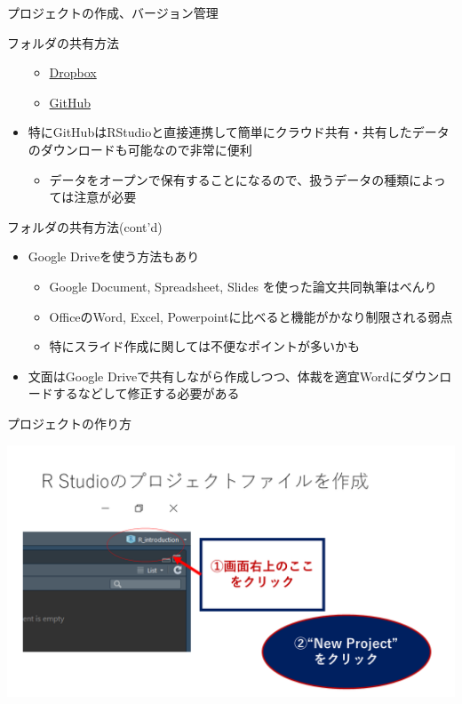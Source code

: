 \documentclass[
  ignorenonframetext,
]{beamer}
\providecommand{\tightlist}{%
  \setlength{\itemsep}{0pt}\setlength{\parskip}{0pt}}
\begin{document}
\begin{frame}{プロジェクトの作成、バージョン管理}
\begin{block}{フォルダの共有方法}
\begin{itemize}
  \begin{itemize}
  \tightlist
  \item
    \href{https://www.dropbox.com/}{Dropbox}
  \item
    \href{https://github.com/}{GitHub}
  \end{itemize}
\item
  特にGitHubはRStudioと直接連携して簡単にクラウド共有・共有したデータのダウンロードも可能なので非常に便利

  \begin{itemize}
  \tightlist
  \item
    データをオープンで保有することになるので、扱うデータの種類によっては注意が必要
  \end{itemize}
\end{itemize}
\end{block}

\begin{block}{フォルダの共有方法(cont'd)}
\protect\hypertarget{ux30d5ux30a9ux30ebux30c0ux306eux5171ux6709ux65b9ux6cd5contd}{}
\begin{itemize}
\tightlist
\item
  Google Driveを使う方法もあり

  \begin{itemize}
  \tightlist
  \item
    Google Document, Spreadsheet, Slides を使った論文共同執筆はべんり
  \item
    OfficeのWord, Excel, Powerpointに比べると機能がかなり制限される弱点
  \item
    特にスライド作成に関しては不便なポイントが多いかも
  \end{itemize}
\item
  文面はGoogle
  Driveで共有しながら作成しつつ、体裁を適宜Wordにダウンロードするなどして修正する必要がある
\end{itemize}
\end{block}

\begin{block}{プロジェクトの作り方}
\protect\hypertarget{ux30d7ux30edux30b8ux30a7ux30afux30c8ux306eux4f5cux308aux65b9}{}
\begin{center}\includegraphics[width=0.95\linewidth]{figs/create_repository} \end{center}
\end{block}


\end{frame}
\end{document}

